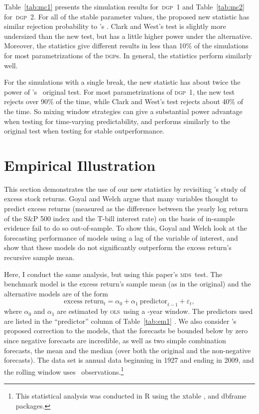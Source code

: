 \documentclass[11pt,fleqn]{article}
\newcommand\citepos[2][]{\citeauthor{#2}'s \citeyearpar[#1]{#2}}
\newcommand\poscw{\citeauthor{ClW:06}'s \citeyearpar{ClW:06,ClW:07}}
\theoremstyle{definition}
\newcommand{\dgp}{\textsc{dgp}}
\newcommand{\mds}{\textsc{mds}}
\newcommand{\ols}{\textsc{ols}}
\begin{document}
Table~\ref{tab:mc1} presents the simulation results for~\textsc{dgp}~1
and Table~\ref{tab:mc2} for~\textsc{dgp}~2.  For all of the stable
parameter values, the proposed new statistic has similar rejection
probability to \citepos{ClW:07}.  Clark and West's test is slightly
more undersized than the new test, but has a little higher power under
the alternative.  Moreover, the statistics give different results in
less than 10\% of the simulations for most parametrizations of the
\dgp s.  In general, the statistics perform similarly well.

For the simulations with a single break, the new statistic has about
twice the power of \poscw\ original test.  For most parametrizations
of \dgp\ 1, the new test rejects over 90\% of the time, while Clark
and West's test rejects about 40\% of the time.  So mixing window
strategies can give a substantial power advantage when testing for
time-varying predictability, and performs similarly to the original
test when testing for stable outperformance.

\section{Empirical Illustration}\label{sec:3}

This section demonstrates the use of our new statistics by revisiting
\citepos{GoW:08} study of excess stock returns.  Goyal and Welch argue
that many variables thought to predict excess returns (measured as the
difference between the yearly log return of the S\&P 500 index and the
T-bill interest rate) on the basis of in-sample evidence fail to do so
out-of-sample.  To show this, Goyal and Welch look at the forecasting
performance of models using a lag of the variable of interest, and
show that these models do not significantly outperform the excess
return's recursive sample mean.

Here, I conduct the same analysis, but using this paper's \mds\ test.
The benchmark model is the excess return's sample mean (as in the
original) and the alternative models are of the form
\[\text{excess return}_{t} = \alpha_{0} + \alpha_{1}\ 
\text{predictor}_{t-1} + \varepsilon_{t},\] where $\alpha_{0}$ and
$\alpha_{1}$ are estimated by \ols\ using a \windowlength-year window.
The predictors used are listed in the ``predictor'' column of
Table~\ref{tab:em1} \citep[see][for a detailed description of the
variables]{GoW:08}.  We also consider \citepos{CaT:08} proposed
correction to the models, that the forecasts be bounded below by zero
since negative forecasts are incredible, as well as two simple
combination forecasts, the mean and the median (over both the original
and the non-negative forecasts).  The data set is annual data
beginning in 1927 and ending in 2009, and the rolling window uses
\windowlength\ observations.\footnote{This statistical analysis was
  conducted in R \citep{R} using the xtable
  \citep[version~1.6-0]{Dah:09}, and dbframe \citep[version
  0.2.5]{Cal:10b} packages.}
\end{document}

